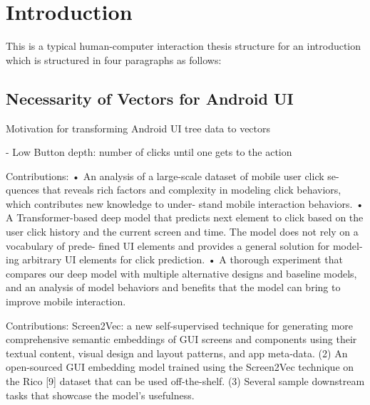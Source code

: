 \chapter{Introduction}
\label{sec:introduction}

This is a typical human-computer interaction thesis structure for an introduction which is structured in four paragraphs as follows:

\section{Necessarity of Vectors for Android UI}

Motivation for transforming Android UI tree data to vectors

- Low Button depth: number of clicks until one gets to the action \cite{lee2018click}

Contributions: \cite{zhou2021large}
• An analysis of a large-scale dataset of mobile user click se-
quences that reveals rich factors and complexity in modeling
click behaviors, which contributes new knowledge to under-
stand mobile interaction behaviors.
• A Transformer-based deep model that predicts next element
to click based on the user click history and the current screen
and time. The model does not rely on a vocabulary of prede-
fined UI elements and provides a general solution for model-
ing arbitrary UI elements for click prediction.
• A thorough experiment that compares our deep model with
multiple alternative designs and baseline models, and an
analysis of model behaviors and benefits that the model can
bring to improve mobile interaction.

Contributions: \cite{screen2vec}
Screen2Vec: a new self-supervised technique for generating
more comprehensive semantic embeddings of GUI screens
and components using their textual content, visual design
and layout patterns, and app meta-data.
(2) An open-sourced GUI embedding model trained using the
Screen2Vec technique on the Rico [9] dataset that can be
used off-the-shelf.
(3) Several sample downstream tasks that showcase the model’s
usefulness.

\label{subsec:motivation}




